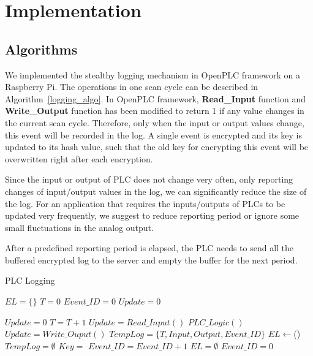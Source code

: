\section{Implementation}

\subsection{Algorithms}

We implemented the stealthy logging mechanism in OpenPLC framework on a Raspberry Pi. The operations in one scan cycle can be described in Algorithm~\ref{logging_algo}. In OpenPLC framework, \textbf{Read\_Input} function and \textbf{Write\_Output} function has been modified to return 1 if any value changes in the current scan cycle. Therefore, only when the input or output values change, this event will be recorded in the log. A single event is encrypted and its key is updated to its hash value, such that the old key for encrypting this event will be overwritten right after each encryption. 

Since the input or output of PLC does not change very often, only reporting changes of input/output values in the log, we can significantly reduce the size of the log. For an application that requires the inputs/outputs of PLCs to be updated very frequently, we suggest to reduce reporting period or ignore some small fluctuations in the analog output.  

After a predefined reporting period is elapsed, the PLC needs to send all the buffered encrypted log to the server and empty the buffer for the next period.

\begin{algorithm}[!t]
\caption{PLC Logging}\label{logging_algo}
\begin{algorithmic}[1]
	
	\State $EL = \{\}$
	\State $T = 0$
	\State $Event\_ID = 0$
	\State $Update = 0$
	
	 
		\State $Update = 0$
		\State $T = T + 1$
		\State $Update = Read\_Input()$
		\State $PLC\_Logic()$
		\State $Update = Write\_Ouput()$
			\State $TempLog = \{T, Input, Output, Event\_ID\}$
			\State $EL \gets $()
			\State $TempLog = \emptyset$ 
			\State $Key = $
			\State $Event\_ID = Event\_ID + 1$
		\EndIf
			\State {}
			\State $EL = \emptyset$ 
			\State $Event\_ID = 0$
		\EndIf
	\EndWhile
\EndProcedure
\end{algorithmic}
\end{algorithm}

